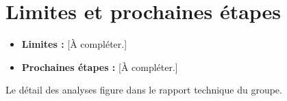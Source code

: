 \documentclass[11pt, a4paper]{article}
\begin{document}
\section{Limites et prochaines étapes}
\begin{itemize}
  \item \textbf{Limites :} [À compléter.]
  \item \textbf{Prochaines étapes :} [À compléter.]
\end{itemize}

\vfill
{\small\color{gray} Le détail des analyses figure dans le rapport technique du
groupe.}
\end{document}
